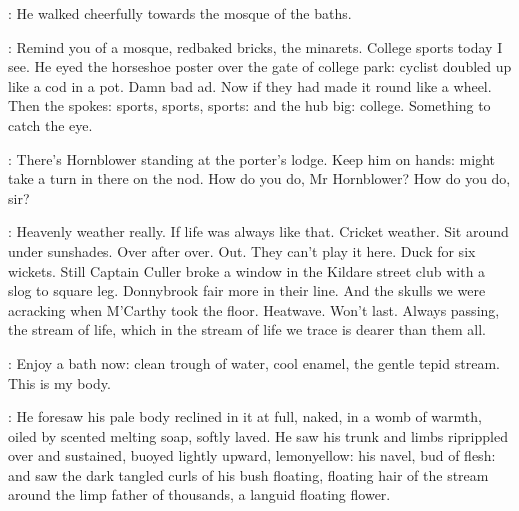 :
He walked cheerfully towards the mosque of the baths.

\BloomInt:
Remind you of a mosque,
redbaked bricks, the minarets.
College sports today I see.
He eyed the horseshoe poster over the gate of college park:
cyclist doubled up like a cod in a pot.
Damn bad ad.
Now if they had made it round like a wheel.
Then the spokes:
sports, sports, sports: and the hub big:
college.
Something to catch the eye.

\BloomInt:
There's Hornblower standing at the porter's lodge.
Keep him on hands:
might take a turn in there on the nod.
How do you do, Mr Hornblower?
How do you do, sir?

\BloomInt:
Heavenly weather really.
If life was always like that.
Cricket weather.
Sit around under sunshades.
Over after over.
Out.
They can't play it here.
Duck for six wickets.
Still Captain Culler broke a window in the Kildare street club
with a slog to square leg.
Donnybrook fair more in their line.
And the skulls we were acracking when M'Carthy took the floor.
Heatwave.
Won't last.
Always passing,
the stream of life,
which in the stream of life we trace
is dearer than them all.

\BloomInt:
Enjoy a bath now:
clean trough of water,
cool enamel,
the gentle tepid stream.
This is my body.

:
He foresaw his pale body reclined in it at full,
naked,
in a womb of warmth,
oiled by scented melting soap,
softly laved.
He saw his trunk and limbs riprippled over
and sustained,
buoyed lightly upward,
lemonyellow:
his navel, bud of flesh:
and saw the dark tangled curls of his bush
floating,
floating hair of the stream
around the limp father of thousands,
a languid floating flower.


